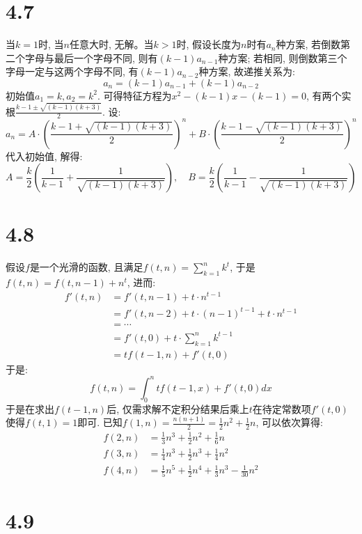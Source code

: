 \documentclass[UTF8,oneside]{article}
\begin{document}
\section{4.7}

当$k=1$时, 当$n$任意大时, 无解。当$k>1$时, 假设长度为$n$时有$a_n$种方案, 若倒数第二个字母与最后一个字母不同, 则有$(k-1)a_{n-1}$种方案; 若相同, 则倒数第三个字母一定与这两个字母不同, 有$(k-1)a_{n-2}$种方案, 故递推关系为:
\[
    a_n = (k-1)a_{n-1} + (k-1)a_{n-2}
\]
初始值$a_1 = k, a_2 = k^2$. 可得特征方程为$x^2 - (k-1)x - (k-1) = 0$, 有两个实根$\frac{k-1 \pm \sqrt{(k-1)(k+3)}}{2}$. 设:
\[
    a_n = A\cdot \left ( \frac{k-1 + \sqrt{(k-1)(k+3)}}{2} \right)^n + B\cdot \left ( \frac{k-1 - \sqrt{(k-1)(k+3)}}{2} \right)^n
\]
代入初始值, 解得:
\[
    A = \frac{k}{2}\left (\frac{1}{k-1} + \frac{1}{\sqrt{(k-1)(k+3)}} \right ),\quad  B = \frac{k}{2}\left ( \frac{1}{k-1} - \frac{1}{\sqrt{(k-1)(k+3)}} \right )
\]

\section{4.8}

假设$f$是一个光滑的函数, 且满足$f(t, n) = \sum_{k=1}^n k^t$, 于是$f(t, n) = f(t, n-1) + n^t$, 进而:
\begin{align*}
    f'(t, n) &= f'(t, n-1) + t\cdot n^{t-1} \\
    &= f'(t, n-2) + t\cdot (n-1)^{t-1} + t\cdot n^{t-1} \\
    &= \cdots \\
    &= f'(t, 0) + t\cdot \sum_{k=1}^n k^{t-1} \\
    &= tf(t-1, n) + f'(t, 0)
\end{align*}
于是:
\[
    f(t, n) = \int_{0}^n tf(t-1, x) + f'(t, 0) dx
\]
于是在求出$f(t-1, n)$后, 仅需求解不定积分结果后乘上$t$在待定常数项$f'(t, 0)$使得$f(t, 1)=1$即可. 已知$f(1,n)= \frac{n(n+1)}{2} = \frac{1}{2}n^2 + \frac{1}{2}n$, 可以依次算得:
\begin{align*}
    f(2, n) &= \frac{1}{3}n^3 + \frac{1}{2}n^2 + \frac{1}{6}n \\
    f(3, n) &= \frac{1}{4}n^3 + \frac{1}{2}n^3 + \frac{1}{4}n^2\\
    f(4, n) &= \frac{1}{5}n^5 + \frac{1}{2}n^4 + \frac{1}{3}n^3 - \frac{1}{30}n^2
\end{align*}

\section{4.9}
\end{document}
